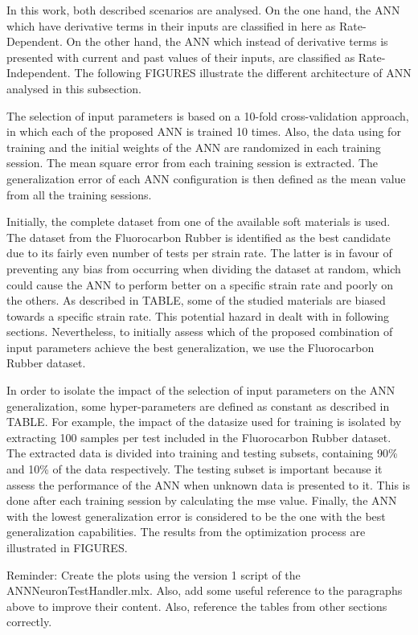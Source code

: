 In this work, both described scenarios are analysed. On the one hand, the ANN which have derivative terms in their inputs are classified in here as Rate-Dependent. On the other hand, the ANN which instead of derivative terms is presented with current and past values of their inputs, are classified as Rate-Independent. The following FIGURES illustrate the different architecture of ANN analysed in this subsection.



The selection of input parameters is based on a 10-fold cross-validation approach, in which each of the proposed ANN is trained 10 times. Also, the data using for training and the initial weights of the ANN are randomized in each training session. The mean square error from each training session is extracted. The generalization error of each ANN configuration is then defined as the mean value from all the training sessions. 

Initially, the complete dataset from one of the available soft materials is used. The dataset from the Fluorocarbon Rubber is identified as the best candidate due to its fairly even number of tests per strain rate. The latter is in favour of preventing any bias from occurring when dividing the dataset at random, which could cause the ANN to perform better on a specific strain rate and poorly on the others. As described in TABLE, some of the studied materials are biased towards a specific strain rate. This potential hazard in dealt with in following sections. Nevertheless, to initially assess which of the proposed combination of input parameters achieve the best generalization, we use the Fluorocarbon Rubber dataset. 

In order to isolate the impact of the selection of input parameters on the ANN generalization, some hyper-parameters are defined as constant as described in TABLE. For example, the impact of the datasize used for training is isolated by extracting 100 samples per test included in the Fluorocarbon Rubber dataset. The extracted data is divided into training and testing subsets, containing 90\% and 10\% of the data respectively. The testing subset is important because it assess the performance of the ANN when unknown data is presented to it. This is done after each training session by calculating the mse value. Finally, the ANN with the lowest generalization error is considered to be the one with the best generalization capabilities. The results from the optimization process are illustrated in FIGURES.

Reminder: Create the plots using the version 1 script of the ANNNeuronTestHandler.mlx. Also, add some useful reference to the paragraphs above to improve their content. Also, reference the tables from other sections correctly.


